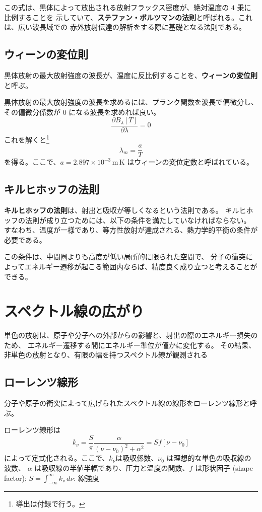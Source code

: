 \documentclass[book]{dennou777}
\newcommand{\hmunit}[1]{\,\mathrm{#1}}
\newcommand{\hmemph}[1]{\textbf{#1}}
\begin{document}
この式は、黒体によって放出される放射フラックス密度が、絶対温度の \(4\) 乗に比例することを
示していて、\hmemph{ステファン・ボルツマンの法則}と呼ばれる。これは、広い波長域での
赤外放射伝達の解析をする際に基礎となる法則である。

\subsection{ウィーンの変位則}
黒体放射の最大放射強度の波長が、温度に反比例することを、\hmemph{ウィーンの変位則}と呼ぶ。

黒体放射の最大放射強度の波長を求めるには、プランク関数を波長で偏微分し、その偏微分係数が
\(0\) になる波長を求めれば良い。
\begin{equation}
	\frac{\partial B_\lambda[T]}{\partial\lambda}=0
\end{equation}
これを解くと\footnote{導出は付録で行う。}
\begin{equation}
	\lambda_m=\frac{a}{T}
\end{equation}
を得る。ここで、\(a=2.897\times10^{-3}\hmunit{m\,K}\) はウィーンの変位定数と呼ばれている。

\subsection{キルヒホッフの法則}
\hmemph{キルヒホッフの法則}は、射出と吸収が等しくなるという法則である。
キルヒホッフの法則が成り立つためには、以下の条件を満たしていなければならない。
すなわち、温度が一様であり、等方性放射が達成される、熱力学的平衡の条件が必要である。

この条件は、中間圏よりも高度が低い局所的に限られた空間で、
分子の衝突によってエネルギー遷移が起こる範囲内ならば、精度良く成り立つと考えることができる。

\section{スペクトル線の広がり}
単色の放射は、原子や分子への外部からの影響と、射出の際のエネルギー損失のため、
エネルギー遷移する間にエネルギー準位が僅かに変化する。
その結果、非単色の放射となり、有限の幅を持つスペクトル線が観測される

\subsection{ローレンツ線形}
分子や原子の衝突によって広げられたスペクトル線の線形をローレンツ線形と呼ぶ。

ローレンツ線形は
\begin{equation}
	k_\nu=\frac{S}{\pi}\frac{\alpha}{(\nu-\nu_0)^2+\alpha^2}=Sf[\nu-\nu_0]
\end{equation}
によって定式化される。ここで、\(k_\nu\)は吸収係数、\(\nu_0\) は理想的な単色の吸収線の波数、
\(\alpha\) は吸収線の半値半幅であり、圧力と温度の関数、\(f\) は形状因子 (shape factor);\quad
\(\displaystyle S=\int^\infty_{-\infty}k_\nu\,d\nu\): 線強度
\end{document}
